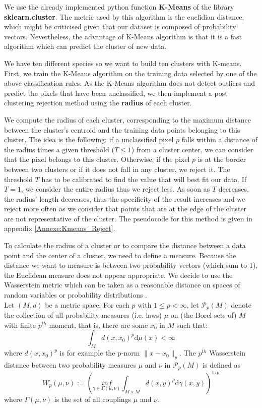\documentclass{siamart171218}
\begin{document}
We use the already implemented python function \textbf{K-Means} of the library \textbf{sklearn.cluster}. The metric used by this algorithm is the euclidian distance, which might be criticised given that our dataset is composed of probability vectors. Nevertheless, the advantage of K-Means algorithm is that it is a fast algorithm which can predict the cluster of new data.

We have ten different species so we want to build ten clusters with K-means. First, we train the K-Means algorithm on the training data selected by one of the above classification rules. As the K-Means algorithm does not detect outliers and predict the pixels that have been unclassified, we then implement a post clustering rejection method using the \textbf{radius} of each cluster. 

We compute the radius of each cluster, corresponding to the maximum distance between the cluster's centroid and the training data points belonging to this cluster.
The idea is the following: if a unclassified pixel $p$ falls within a distance of the radius times a given threshold ($T \le 1$) from a cluster center, we can consider that the pixel belongs to this cluster. Otherwise, if the pixel $p$ is at the border between two clusters or if it does not fall in any cluster, we reject it. The threshold $T$ has to be calibrated to find the value that will best fit our data.  If $T=1$, we consider the entire radius thus we reject less. As soon as $T$ decreases, the radius' length decreases, thus the specificity of the result increases and we reject more often as we consider that points that are at the edge of the cluster are not representative of the cluster. The pseudocode for this method is given in appendix \ref{Annexe:Kmeans_Reject}.  

To calculate the radius of a cluster or to compare the distance between a data point and the center of a cluster, we need to define a measure. Because the distance we want to measure is between two probability vectors (which sum to 1), the Euclidean measure does not appear appropriate. We decide to use the Wasserstein metric which can be taken as a reasonable distance on spaces of random variables or probability distributions \cite{givens1984class}. \\
Let $(M,d)$ be a metric space. For each $p$ with $1 \le p < \infty$, let $\mathcal{P}_p (M)$ denote the collection of all probability measures (i.e. laws) $\mu$ on (the Borel sets of) $M$ with finite $p^{th}$ moment, that is, there are some $x_0$ in $M$ such that: 
\begin{equation}
\int_{M} d(x,x_0)^p \mathrm{d}\mu(x) < \infty
    \label{eq_moments}
\end{equation}
where $d(x,x_0)^p$ is for example the p-norm $\lVert x - x_0 \rVert_p$. 
The $p^{th}$ Wasserstein distance between two probability measures $\mu$ and $\nu$ in $\mathcal{P}_p (M)$ is defined as 
\begin{equation}
W_p(\mu,\nu):=  \left( \underset{\gamma \in \Gamma (\mu,\nu)}{inf} \int_{M\times M} d(x,y)^p \mathrm{d}\gamma(x,y) \right )^{1/p} 
    \label{Wasserstein}
\end{equation}
where $\Gamma (\mu,\nu)$ is the set of all couplings $\mu$ and $\nu$. 
\end{document}
